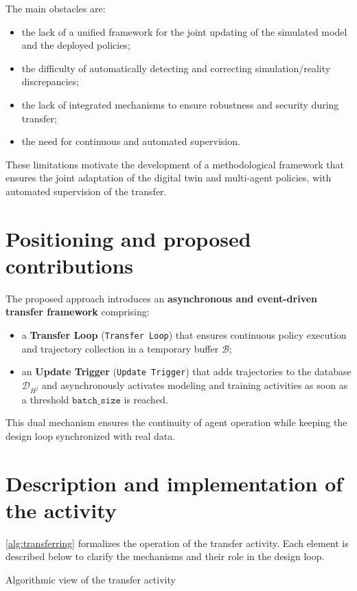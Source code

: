 \begin{itemize}
The main obstacles are:
\begin{itemize}
  \item the lack of a unified framework for the joint updating of the simulated model and the deployed policies;
  \item the difficulty of automatically detecting and correcting simulation/reality discrepancies;
  \item the lack of integrated mechanisms to ensure robustness and security during transfer;
  \item the need for continuous and automated supervision.
\end{itemize}

These limitations motivate the development of a methodological framework that ensures the joint adaptation of the digital twin and multi-agent policies, with automated supervision of the transfer.

\section{Positioning and proposed contributions}

The proposed approach introduces an \textbf{asynchronous and event-driven transfer framework} comprising:
\begin{itemize}
  \item a \textbf{Transfer Loop} (\texttt{Transfer Loop}) that ensures continuous policy execution and trajectory collection in a temporary buffer $\mathcal{B}$;
  \item an \textbf{Update Trigger} (\texttt{Update Trigger}) that adds trajectories to the database $\mathcal{D}_{H^j}$ and asynchronously activates modeling and training activities as soon as a threshold $\texttt{batch\_size}$ is reached.
\end{itemize}

This dual mechanism ensures the continuity of agent operation while keeping the design loop synchronized with real data.

\section{Description and implementation of the activity}

\autoref{alg:transferring} formalizes the operation of the transfer activity.
Each element is described below to clarify the mechanisms and their role in the design loop.


\vspace{-0.3em}
\begin{algorithm}[h!]
  \caption{Algorithmic view of the transfer activity}
  \label{alg:transferring}
  \DontPrintSemicolon


\end{algorithm}
\end{itemize}
